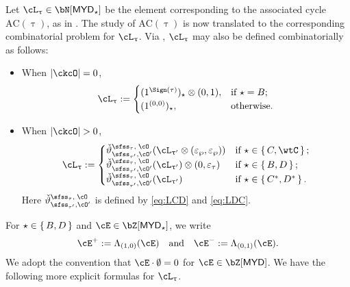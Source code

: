 \documentclass[12pt,a4paper]{amsart}
\newcommand{\AC}{\mathrm{AC}}
\def\MYD{{\mathsf{MYD}}}
\def\abs#1{\left|{#1}\right|}
\numberwithin{equation}{section}
\theoremstyle{remark}
\def\uptaup{\uptau^{\prime}}
\begin{document}
Let $\ac_{\uptau}\in \bN[\MYD_\star]$ be the element corresponding to the
associated cycle $\AC(\uptau)$, as in .
The study of $\AC(\uptau)$ is now translated to
the corresponding combinatorial problem for $\ac_{\uptau}$.
Via , $\ac_{\uptau}$ may also be
defined combinatorially as follows:
\begin{itemize}
\item
When $\abs{\ckcO}=0$,
\[
  \ac_{\uptau} :=
  \begin{cases}
   (1^{\Sign(\tau)})_{\star}\lotimes(0,1), & \text{if } \star=B;\\
   (1^{(0,0)})_{\star}, & \text{otherwise}.
  \end{cases}
\]
\item
When $\abs{\ckcO} >0$,
\[
\ac_{\uptau} :=
\begin{cases}
  \dlifttso(\ac_{\uptaup}\lotimes (\varepsilon_{\wp},\varepsilon_{\wp}))
  & \text{if } \star\in \set{C,\wtC};\\
  \dlifttso(\ac_{\uptaup})\lotimes (0,\varepsilon_{\tau})
  & \text{if } \star \in \set{B,D}; \\
  \dlifttso(\ac_{\uptaup})
  & \text{if } \star \in \set{C^*,D^{*}}. \\
\end{cases}
\]
Here $\dlifttso$ is defined by \eqref{eq:LCD} and \eqref{eq:LDC}.
\end{itemize}
For $\star\in \set{B,D}$ and $\cE\in \bZ[\MYD_{\star}]$, we write
\[
\cE^{+} := \Lambda_{(1,0)}(\cE) \AND \cE^{-} := \Lambda_{(0,1)}(\cE).
\]
We adopt the convention that $\cE\cdot \emptyset = 0$ for $\cE\in\bZ[\MYD]$.
We have the following more explicit formulas for $\ac_{\uptau}$.
\end{document}
